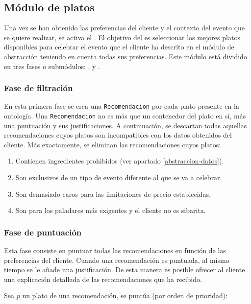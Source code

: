 % 

\subsection{Módulo de platos}
Una vez se han obtenido las preferencias del cliente y el contexto del evento que se quiere realizar, se activa el
.
El objetivo del  es seleccionar los mejores platos disponibles para celebrar el evento que el cliente ha 
descrito en el módulo de abstracción teniendo en cuenta todas sus preferencias. Este módulo está dividido en tres fases o submódulos: ,  y .

\subsubsection{Fase de filtración}
En esta primera fase se crea una \texttt{Recomendacion} por cada plato presente en la ontología. Una \texttt{Recomendacion} no es más
que un contenedor del plato en sí, más una puntuación y sus justificaciones.
A continuación, se descartan todas aquellas recomendaciones cuyos platos son incompatibles con los datos obtenidos del cliente. Más
exactamente, se eliminan las recomendaciones cuyos platos:

\begin{enumerate}
\item Contienen ingredientes prohibidos (ver apartado \ref{abstraccion-datos}).
\item Son exclusivos de un tipo de evento diferente al que se va a celebrar.
\item Son demasiado caros para las limitaciones de precio establecidas.
\item Son para los paladares más exigentes y el cliente no es sibarita.
\end{enumerate}

\subsubsection{Fase de puntuación}
Esta fase consiste en puntuar todas las recomendaciones en función de las preferencias del cliente. Cuando una recomendación
es puntuada, al mismo tiempo se le añade una justificación. De esta manera es posible ofrecer al cliente una explicación detallada
de las recomendaciones que ha recibido.

Sea $p$ un plato de una recomendación, se puntúa (por orden de prioridad):


